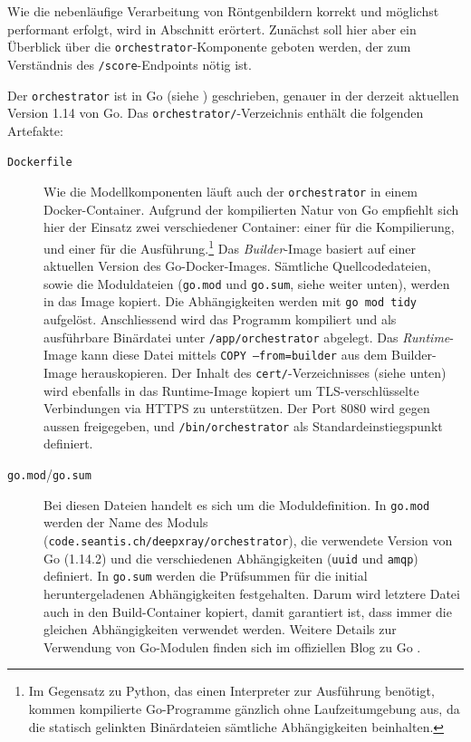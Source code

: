Wie die nebenläufige Verarbeitung von Röntgenbildern korrekt und möglichst performant erfolgt, wird in Abschnitt  erörtert. Zunächst soll hier aber ein Überblick über die \texttt{orchestrator}-Komponente geboten werden, der zum Verständnis des \texttt{/score}-Endpoints nötig ist.

Der \texttt{orchestrator} ist in Go (siehe ) geschrieben, genauer in der derzeit aktuellen Version 1.14 von Go. Das \texttt{orchestrator/}-Ver\-zeich\-nis enthält die folgenden Artefakte:

\begin{description}
    \item[\texttt{Dockerfile}] Wie die Modellkomponenten läuft auch der \texttt{orchestrator} in einem Docker-Container. Aufgrund der kompilierten Natur von Go empfiehlt sich hier der Einsatz zwei verschiedener Container: einer für die Kompilierung, und einer für die Ausführung.\footnote{Im Gegensatz zu Python, das einen Interpreter zur Ausführung benötigt, kommen kompilierte Go-Programme gänzlich ohne Laufzeitumgebung aus, da die statisch gelinkten Binärdateien sämtliche Abhängigkeiten beinhalten.} Das \textit{Builder}-Image basiert auf einer aktuellen Version des Go-Docker-Images. Sämtliche Quellcodedateien, sowie die Moduldateien (\texttt{go.mod} und \texttt{go.sum}, siehe weiter unten), werden in das Image kopiert. Die Abhängigkeiten werden mit \texttt{go mod tidy} aufgelöst. Anschliessend wird das Programm kompiliert und als ausführbare Binärdatei unter \texttt{/app/orchestrator} abgelegt. Das \textit{Runtime}-Image kann diese Datei mittels \texttt{COPY --from=builder} aus dem Builder-Image herauskopieren. Der Inhalt des \texttt{cert/}-Verzeichnisses (siehe unten) wird ebenfalls in das Runtime-Image kopiert um TLS-verschlüsselte Verbindungen via HTTPS zu unterstützen. Der Port 8080 wird gegen aussen freigegeben, und \texttt{/bin/orchestrator} als Standardeinstiegspunkt definiert.
    \item[\texttt{go.mod}/\texttt{go.sum}] Bei diesen Dateien handelt es sich um die Moduldefinition. In \texttt{go.mod} werden der Name des Moduls (\texttt{code.seantis.ch/deepxray/orchestrator}), die verwendete Version von Go (1.14.2) und die verschiedenen Abhängigkeiten (\texttt{uuid} und \texttt{amqp}) definiert. In \texttt{go.sum} werden die Prüfsummen für die initial heruntergeladenen Abhängigkeiten festgehalten. Darum wird letztere Datei auch in den Build-Container kopiert, damit garantiert ist, dass immer die gleichen Abhängigkeiten verwendet werden. Weitere Details zur Verwendung von Go-Modulen finden sich im offiziellen Blog zu Go \cite{using-go-modules}.

\end{description}
